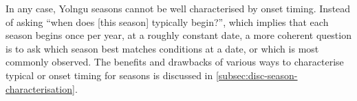 In any case, Yolngu seasons cannot be well characterised by onset timing.
Instead of asking ``when does [this season] typically begin?'', which implies
that each season begins once per year, at a roughly constant date, a more
coherent question is to ask which season best matches conditions at a date,
or which is most commonly observed.
%
The benefits and drawbacks of various ways to characterise typical or onset
timing for seasons is discussed in \cref{subsec:disc-season-characterisation}.

